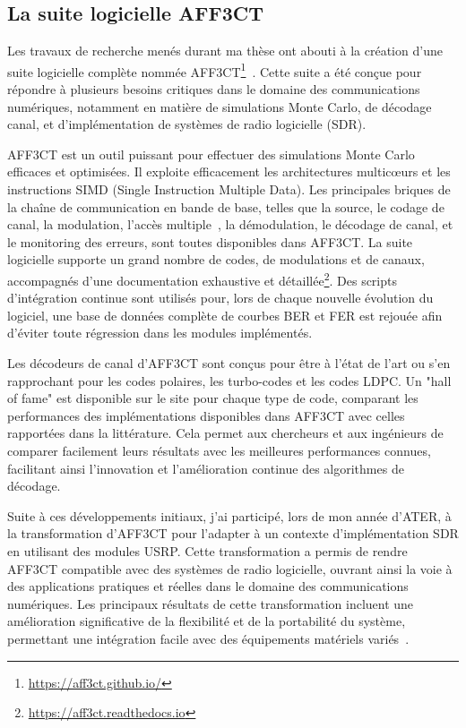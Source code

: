 \documentclass[11pt]{report}
\begin{document}
\subsection{La suite logicielle AFF3CT}
Les travaux de recherche menés durant ma thèse ont abouti à la création d'une suite logicielle complète nommée AFF3CT\footnote{\url{https://aff3ct.github.io/}}~\cite{cassagne:hal-02358306,cassagne:hal-01965633}. Cette suite a été conçue pour répondre à plusieurs besoins critiques dans le domaine des communications numériques, notamment en matière de simulations Monte Carlo, de décodage canal, et d'implémentation de systèmes de radio logicielle (SDR).

AFF3CT est un outil puissant pour effectuer des simulations Monte Carlo efficaces et optimisées. Il exploite efficacement les architectures multicœurs et les instructions SIMD (Single Instruction Multiple Data). Les principales briques de la chaîne de communication en bande de base, telles que la source, le codage de canal, la modulation, l'accès multiple~\cite{ghaffari:hal-01977885,ghaffari:hal-03762203}, la démodulation, le décodage de canal, et le monitoring des erreurs, sont toutes disponibles dans AFF3CT. La suite logicielle supporte un grand nombre de codes, de modulations et de canaux, accompagnés d'une documentation exhaustive et détaillée\footnote{\url{https://aff3ct.readthedocs.io}}. Des scripts d'intégration continue sont utilisés pour, lors de chaque nouvelle évolution du logiciel, une base de données complète de courbes BER et FER est rejouée afin d'éviter toute régression dans les modules implémentés.

Les décodeurs de canal d'AFF3CT sont conçus pour être à l'état de l'art ou s'en rapprochant pour les codes polaires, les turbo-codes et les codes LDPC. Un "hall of fame" est disponible sur le site pour chaque type de code, comparant les performances des implémentations disponibles dans AFF3CT avec celles rapportées dans la littérature. Cela permet aux chercheurs et aux ingénieurs de comparer facilement leurs résultats avec les meilleures performances connues, facilitant ainsi l'innovation et l'amélioration continue des algorithmes de décodage.

Suite à ces développements initiaux, j'ai participé, lors de mon année d'ATER, à la transformation d'AFF3CT pour l'adapter à un contexte d'implémentation SDR en utilisant des modules USRP. Cette transformation a permis de rendre AFF3CT compatible avec des systèmes de radio logicielle, ouvrant ainsi la voie à des applications pratiques et réelles dans le domaine des communications numériques. Les principaux résultats de cette transformation incluent une amélioration significative de la flexibilité et de la portabilité du système, permettant une intégration facile avec des équipements matériels variés~\cite{cassagne:hal-03336450}.
\end{document}
